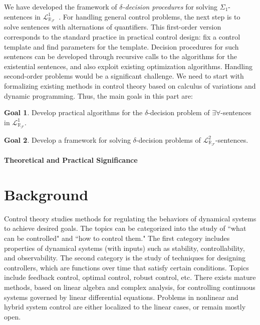 \documentclass[10pt]{article}
\newcommand{\lrf}{\mathcal{L}_{\mathbb{R}_{\mathcal{F}}}}
\theoremstyle{definition}
\newtheorem{goal}{Goal}
\begin{document}
We have developed the framework of {\em $\delta$-decision procedures} for solving $\Sigma_1$-sentences in $\lrf^1$~\cite{DBLP:conf/cade/GaoAC12}. For handling general control problems, the next step is to solve sentences with alternations of quantifiers. This first-order version corresponds to the standard practice in practical control design: fix a control template and find parameters for the template. Decision procedures for such sentences can be developed through recursive calls to the algorithms for the existential sentences, and also exploit existing optimization algorithms. Handling second-order problems would be a significant challenge. We need to start with formalizing existing methods in control theory based on calculus of variations and dynamic programming. Thus, the main goals in this part are:
\begin{goal}
Develop practical algorithms for the $\delta$-decision problem of $\exists\forall$-sentences in $\lrf^1$.
\end{goal}
\begin{goal}
Develop a framework for solving $\delta$-decision problems of $\lrf^2$-sentences.
\end{goal}

\paragraph{Theoretical and Practical Significance}


\section{Background}


Control theory studies methods for regulating the behaviors of dynamical systems to achieve desired goals. The topics can be categorized into the study of ``what can be controlled" and ``how to control them." The first category includes properties of dynamical systems (with inputs) such as stability, controllability, and observability. The second category is the study of techniques for designing controllers, which are functions over time that satisfy certain conditions. Topics include feedback control, optimal control, robust control, etc. There exists mature methods, based on linear algebra and complex analysis, for controlling continuous systems governed by linear differential equations. Problems in nonlinear and hybrid system control are either localized to the linear cases, or remain mostly open. 
\end{document}
